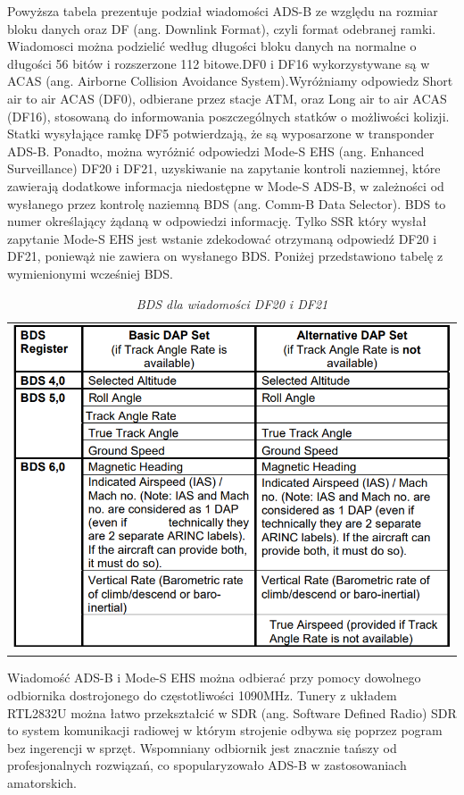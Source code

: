 \documentclass[eng,printmode]{mgr}
\begin{document}
Powyższa tabela prezentuje podział wiadomości ADS-B ze względu na rozmiar bloku danych oraz DF (ang. Downlink Format), czyli format odebranej ramki. Wiadomosci można podzielić według długości bloku danych na normalne o długości 56 bitów i rozszerzone 112 bitowe.DF0 i DF16 wykorzystywane są w ACAS (ang. Airborne Collision Avoidance System).Wyróżniamy odpowiedz Short air to air ACAS (DF0), odbierane przez stacje ATM, oraz Long air to air ACAS (DF16), stosowaną do informowania poszczególnych statków o możliwości kolizji. Statki wysyłające ramkę DF5 potwierdzają, że są wyposarzone w transponder ADS-B. Ponadto, można wyróżnić odpowiedzi Mode-S EHS (ang. Enhanced Surveillance) DF20 i DF21, uzyskiwanie na zapytanie kontroli naziemnej, które zawierają dodatkowe informacja niedostępne w Mode-S ADS-B, w zależności od wysłanego przez kontrolę naziemną BDS (ang. Comm-B Data Selector). BDS to numer określający żądaną w odpowiedzi informację. Tylko SSR który wysłał zapytanie Mode-S EHS jest wstanie zdekodować otrzymaną odpowiedź DF20 i DF21, poniewąż nie zawiera on wysłanego BDS. Poniżej przedstawiono tabelę z wymienionymi wcześniej BDS.

\begin{table}[ph]
\caption{\textit{ BDS dla wiadomości DF20 i DF21}}

  \centering
  \begin{tabular}{l}
  \\
    \includegraphics[width=\textwidth]{images/bds.png}
 \end{tabular}
\end{table}

Wiadomość ADS-B i Mode-S EHS można odbierać przy pomocy dowolnego odbiornika dostrojonego do częstotliwości 1090MHz. Tunery z układem RTL2832U można łatwo przekształcić w SDR (ang. Software Defined Radio) SDR to system komunikacji radiowej w którym strojenie odbywa się poprzez pogram bez ingerencji w sprzęt. Wspomniany odbiornik jest znacznie tańszy od profesjonalnych rozwiązań, co spopularyzowało ADS-B w zastosowaniach amatorskich. 
\end{document}
